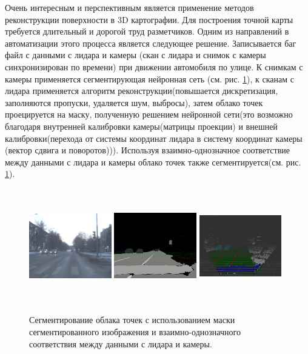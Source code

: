 Очень интересным и перспективным является применение методов реконструкции поверхности в 3D картографии. Для построения точной карты требуется длительный и дорогой труд разметчиков. Одним из направлений в автоматизации этого процесса является следующее решение. Записывается баг файл с данными с лидара и камеры (скан с лидара и снимок с камеры синхронизирован по времени) при движении автомобиля по улице.  К снимкам с камеры применяется сегментирующая нейронная сеть (см. рис. \ref{fig:-2}), к сканам с лидара применяется алгоритм реконструкции(повышается дискретизация, заполняются пропуски, удаляется шум, выбросы), затем облако точек проецируется на маску, полученную решением нейронной сети(это возможно благодаря внутренней калибровки камеры(матрицы проекции) и внешней калибровки(перехода от системы координат лидара в систему координат камеры (вектор сдвига и поворотов))). Используя взаимно-однозначное соответствие между данными с лидара и камеры облако точек также сегментируется(см. рис. \ref{fig:-2}).
\begin{figure}[h]
    \centering
    \includegraphics[width=0.32\textwidth, height=5cm]{images/image.png}
    \includegraphics[width=0.32\textwidth, height=5cm]{images/mask.png}
    \includegraphics[width=0.32\textwidth, height=5cm]{images/painted_cloud.png}
    \caption{Сегментирование облака точек с использованием маски сегментированного изображения и взаимно-однозначного соответствия между данными с лидара и камеры.}
    \label{fig:-2}
\end{figure}

